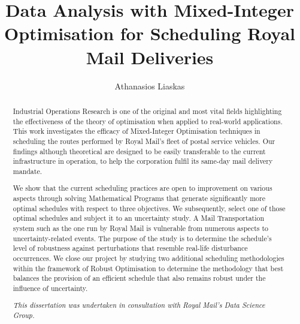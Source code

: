 \documentclass[a4paper, twoside]{report}
\title{Data Analysis with Mixed-Integer Optimisation for Scheduling Royal Mail Deliveries}
\author{Athanasios Liaskas}
\begin{document}


\begin{abstract}
Industrial Operations Research is one of the original and most vital fields highlighting the effectiveness of the theory of optimisation when applied to real-world applications. This work investigates the efficacy of Mixed-Integer Optimisation techniques in scheduling the routes performed by Royal Mail's fleet of postal service vehicles. Our findings although theoretical are designed to be easily transferable to the current infrastructure in operation, to help the corporation fulfil its same-day mail delivery mandate. 

\vspace{\baselineskip}
\noindent
We show that the current scheduling practices are open to improvement on various aspects through solving Mathematical Programs that generate significantly more optimal schedules with respect to three objectives. We subsequently, select one of those optimal schedules and subject it to an uncertainty study. A Mail Transportation system such as the one run by Royal Mail is vulnerable from numerous aspects to uncertainty-related events. The purpose of the study is to determine the schedule's level of robustness against perturbations that resemble real-life disturbance occurrences. We close our project by studying two additional scheduling methodologies within the framework of Robust Optimisation to determine the methodology that best balances the provision of an efficient schedule that also remains robust under the influence of uncertainty.
\end{abstract}

\renewcommand{\abstractname}{Acknowledgements}
\begin{abstract}
\textit{This dissertation was undertaken in consultation with Royal Mail's Data Science Group.}
\end{abstract}


\tableofcontents
\listoftodos






%

%





\end{document}
